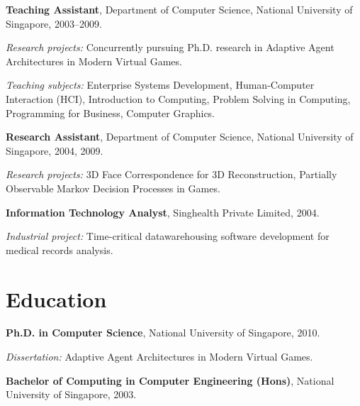 \documentclass[10pt,a4paper]{article}
\renewenvironment{itemize}{
    \begin{list}{}{
            \setlength{\leftmargin}{1.5em}
            \setlength{\itemsep}{0.25em}
            \setlength{\parskip}{0pt}
            \setlength{\parsep}{0.25em}
        }
        }{
    \end{list}
}
\begin{document}
\begin{itemize}
    \item \textbf{Teaching Assistant}, Department of Computer Science, National University of Singapore,
        2003--2009.
        \begin{itemize}
            \item \textit{Research projects:} Concurrently pursuing Ph.D. research in Adaptive Agent Architectures in Modern Virtual Games.
            \item \textit{Teaching subjects:} Enterprise Systems Development, Human-Computer Interaction (HCI), Introduction to Computing, Problem Solving in Computing, Programming for Business, Computer Graphics.
        \end{itemize}

    \item \textbf{Research Assistant}, Department of Computer Science, National University of Singapore,
        2004, 2009.
        \begin{itemize}
            \item \textit{Research projects:} 3D Face Correspondence for 3D Reconstruction, Partially Observable Markov Decision Processes in Games.
        \end{itemize}

    \item \textbf{Information Technology Analyst}, Singhealth Private Limited,
        2004.
        \begin{itemize}
            \item \textit{Industrial project:} Time-critical datawarehousing software development for medical records analysis.
        \end{itemize}

\end{itemize}



\section*{Education}

\begin{itemize}

    \item \textbf{Ph.D. in Computer Science},
        National University of Singapore, 2010.
        \begin{itemize}
            \item \textit{Dissertation:}
                Adaptive Agent Architectures in Modern Virtual Games.
        \end{itemize}

    \item \textbf{Bachelor of Computing in Computer Engineering (Hons)},
        National University of Singapore, 2003.

\end{itemize}
\end{document}
